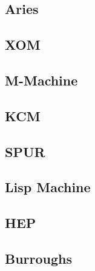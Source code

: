 \subsection{Aries}

\subsection{XOM}

\subsection{M-Machine}

\subsection{KCM}

\subsection{SPUR}

\subsection{Lisp Machine}

\subsection{HEP}

\subsection{Burroughs}






































